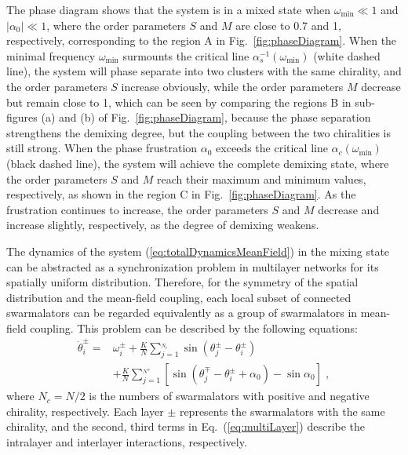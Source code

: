 \documentclass{article}
\begin{document}
The phase diagram shows that the system is in a mixed state when $\omega_{\min}\ll1$ and $\left|\alpha_0\right|\ll1$, where the order parameters $S$ and $M$ are close to 0.7 and 1, respectively, corresponding to the region A in Fig.~\ref{fig:phaseDiagram}.  
When the minimal frequency $\omega_{\min}$ surmounts the critical line $\alpha_s^{-1}(\omega_{\min})$ (white dashed line), the system will phase separate into two clusters with the same chirality, and the order parameters $S$ increase obviously, while the order parameters $M$ decrease but remain close to 1, which can be seen by comparing the regions B in sub-figures (a) and (b) of Fig.~\ref{fig:phaseDiagram}, because the phase separation strengthens the demixing degree, but the coupling between the two chiralities is still strong. 
When the phase frustration $\alpha_0$ exceeds the critical line $\alpha_c(\omega_{\min})$ (black dashed line), the system will achieve the complete demixing state, where the order parameters $S$ and $M$ reach their maximum and minimum values, respectively, as shown in the region C in Fig.~\ref{fig:phaseDiagram}. As the frustration continues to increase, the order parameters $S$ and $M$ decrease and increase slightly, respectively, as the degree of demixing weakens.

The dynamics of the system (\ref{eq:totalDynamicsMeanField}) in the mixing state can be abstracted as a synchronization problem in multilayer networks for its spatially uniform distribution. Therefore, for the symmetry of the spatial distribution and the mean-field coupling, each local subset of connected swarmalators can be regarded equivalently as a group of swarmalators in mean-field coupling.
This problem can be described by the following equations:
\begin{equation}
    \label{eq:multiLayer}
    \begin{aligned}
        \dot{\theta}_{i}^{\pm}=&\omega _{i}^{\pm}+\frac{K}{N}\sum_{j=1}^{_{N_c}}{\sin \left( \theta _{j}^{\pm}-\theta _{i}^{\pm} \right)}\\
        &+\frac{K}{N}\sum_{j=1}^{_{N^{\mp}}}{\left[ \sin \left( \theta _{j}^{\mp}-\theta _{i}^{\pm}+\alpha _0 \right) -\sin \alpha _0 \right]}\;,
    \end{aligned}
\end{equation}
where $N_c=N/2$ is the numbers of swarmalators with positive and negative chirality, respectively. 
Each layer $\pm$ represents the swarmalators with the same chirality, and the second, third terms in Eq.~(\ref{eq:multiLayer}) describe the intralayer and interlayer interactions, respectively.
\end{document}
